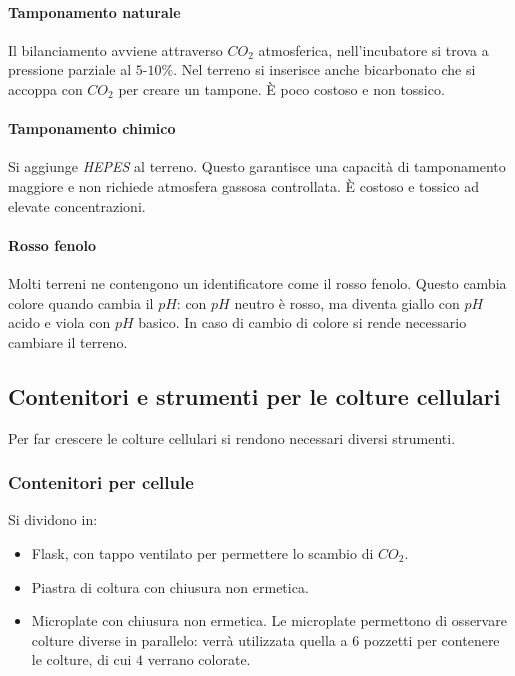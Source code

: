 			\paragraph{Tamponamento naturale}
			Il bilanciamento avviene attraverso \emph{$CO_2$} atmosferica, nell'incubatore si trova a pressione parziale al $5$-$10\%$.
			Nel terreno si inserisce anche bicarbonato che si accoppa con \emph{$CO_2$} per creare un tampone.
			\`E poco costoso e non tossico.

			\paragraph{Tamponamento chimico}
			Si aggiunge \emph{HEPES} al terreno. 
			Questo garantisce una capacit\`a di tamponamento maggiore e non richiede atmosfera gassosa controllata.
			\`E costoso e tossico ad elevate concentrazioni.

			\paragraph{Rosso fenolo}
			Molti terreni ne contengono un identificatore come il rosso fenolo. 
			Questo cambia colore quando cambia il $pH$: con $pH$ neutro \`e rosso, ma diventa giallo con $pH$ acido e viola con $pH$ basico.
			In caso di cambio di colore si rende necessario cambiare il terreno. 
	
	\subsection{Contenitori e strumenti per le colture cellulari}
	Per far crescere le colture cellulari si rendono necessari diversi strumenti.
	
		\subsubsection{Contenitori per cellule}
		Si dividono in:
		\begin{multicols}{2}
		\begin{itemize}
			\item Flask, con tappo ventilato per permettere lo scambio di \emph{$CO_2$}.
			\item Piastra di coltura con chiusura non ermetica.
			\item Microplate con chiusura non ermetica. 
				Le microplate permettono di osservare colture diverse in parallelo: verr\`a utilizzata quella a $6$ pozzetti per contenere le colture, di cui $4$ verrano colorate.
		\end{itemize}
	\end{multicols}

